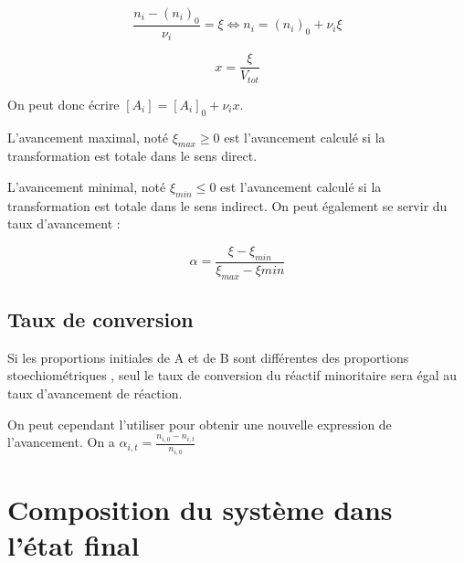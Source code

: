 \documentclass[french]{yLectureNote}
\begin{document}
\begin{definition}
\[\frac{n_i-(n_i)_0}{\nu_i} = \xi \iff n_i = (n_i)_0 + \nu_i \xi\]
\end{definition}

\begin{definition}
\[x = \frac{\xi}{V_{tot}}\]
\end{definition}
On peut donc écrire $ [A_i] = [A_i]_0 + \nu_i x$.

L'avancement maximal, noté $\xi_{max} \geq 0$ est l'avancement calculé si la transformation est totale dans le sens direct.

L'avancement minimal, noté $\xi_{min} \leq 0$ est l'avancement calculé si la transformation est totale dans le sens indirect.
On peut également se servir du taux d'avancement :
\begin{definition}
\[\alpha = \frac{\xi-\xi_{min}}{\xi_{max} - \xi{min}}\]
\end{definition}
\subsection{Taux de conversion}
 Si les proportions initiales de A et de B sont différentes des proportions stoechiométriques , seul le taux de conversion du réactif minoritaire sera égal au taux d'avancement de réaction.

On peut cependant l'utiliser pour obtenir une nouvelle expression de l'avancement. On a \(\alpha_{i,t} = \frac{n_{i,0} - n_{i,t}}{n_{i,0}}\)

\section{Composition du système dans l'état final}
\end{document}
